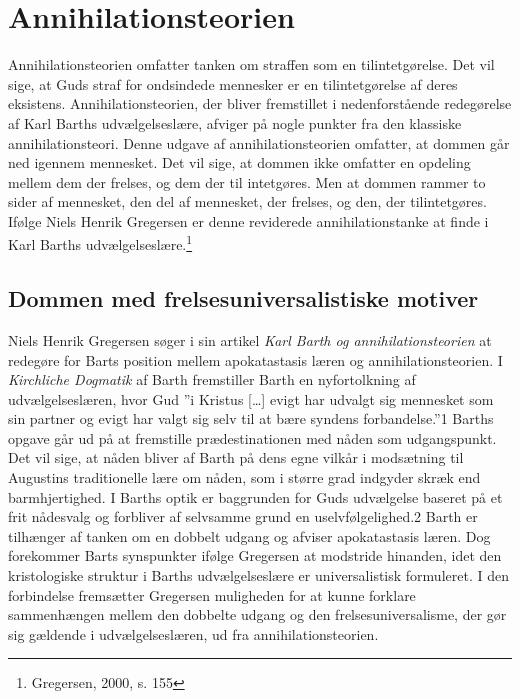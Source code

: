 \chapter{Annihilationsteorien}
Annihilationsteorien omfatter tanken om straffen som en tilintetgørelse. Det vil sige, at Guds straf for ondsindede mennesker er en tilintetgørelse af deres eksistens. Annihilationsteorien, der bliver fremstillet i nedenforstående redegørelse af Karl Barths udvælgelseslære, afviger på nogle punkter fra den klassiske annihilationsteori. Denne udgave af annihilationsteorien omfatter, at dommen går ned igennem mennesket. Det vil sige, at dommen ikke omfatter en opdeling mellem dem der frelses, og dem der til intetgøres. Men at dommen rammer to sider af mennesket, den del af mennesket, der frelses, og den, der tilintetgøres. Ifølge Niels Henrik Gregersen er denne reviderede annihilationstanke at finde i Karl Barths udvælgelseslære.\footnote{Gregersen, 2000, s. 155}   

\section{Dommen med frelsesuniversalistiske motiver}
Niels Henrik Gregersen søger i sin artikel \textit{Karl Barth og annihilationsteorien} at redegøre for Barts position mellem apokatastasis læren og annihilationsteorien. I \textit{Kirchliche Dogmatik} af Barth fremstiller Barth en nyfortolkning af udvælgelseslæren, hvor Gud ”i Kristus […] evigt har udvalgt sig mennesket som sin partner og evigt har valgt sig selv til at bære syndens forbandelse.”1 Barths opgave går ud på at fremstille prædestinationen med nåden som udgangspunkt. Det vil sige, at nåden bliver af Barth på dens egne vilkår i modsætning til Augustins traditionelle lære om nåden, som i større grad indgyder skræk end barmhjertighed. I Barths optik er baggrunden for Guds udvælgelse baseret på et frit nådesvalg og forbliver af selvsamme grund en uselvfølgelighed.2 Barth er tilhænger af tanken om en dobbelt udgang og afviser apokatastasis læren. Dog forekommer Barts synspunkter ifølge Gregersen at modstride hinanden, idet den kristologiske struktur i Barths udvælgelseslære er universalistisk formuleret. I den forbindelse fremsætter Gregersen muligheden for at kunne forklare sammenhængen mellem den dobbelte udgang og den frelsesuniversalisme, der gør sig gældende i udvælgelseslæren, ud fra annihilationsteorien.

